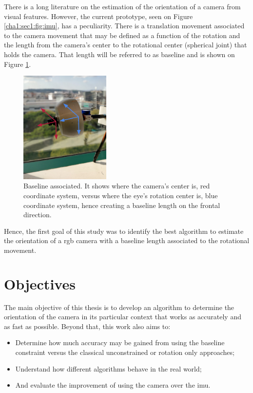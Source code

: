 There is a long literature on the estimation of the orientation of a camera from visual features. However, the current prototype, seen on Figure \ref{cha1:sec1:fig:imu}, has a peculiarity. There is a translation movement associated to the camera movement that may be defined as a function of the rotation and the length from the camera's center to the rotational center (spherical joint) that holds the camera. That length will be referred to as baseline and is shown on Figure \ref{cha1:sec1:fig:baseline}.

\begin{figure}[ht]
	\centering
	\includegraphics[width=0.4\textwidth]{images/prototypeaxis.png}
	\caption[Baseline]{Baseline associated. It shows where the camera's center is, red coordinate system, versus where the eye's rotation center is, blue coordinate system, hence creating a baseline length on the frontal direction.}
	\label{cha1:sec1:fig:baseline}
\end{figure}

Hence, the first goal of this study was to identify the best algorithm to estimate the orientation of a \acrshort{rgb} camera with a baseline length associated to the rotational movement.

\section{Objectives}
\label{cha1:objectives}

The main objective of this thesis is to develop an algorithm to determine the orientation of the camera in its particular context that works as accurately and as fast as possible. Beyond that, this work also aims to:
\begin{itemize}
\item Determine how much accuracy may be gained from using the baseline constraint versus the classical unconstrained or rotation only approaches;
\item Understand how different algorithms behave in the real world;
\item And evaluate the improvement of using the camera over the  \acrshort{imu}.
\end{itemize}

